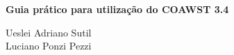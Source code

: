\begingroup
\thispagestyle{empty}
\centering
\vspace*{7cm}
\par\normalfont\fontsize{30}{30}\sffamily\selectfont
\textbf{Guia prático para utilização do COAWST 3.4}\\
{\LARGE }\par %
\vspace*{1cm}
{\Huge Ueslei Adriano Sutil \\ Luciano Ponzi Pezzi}\par %
\endgroup
